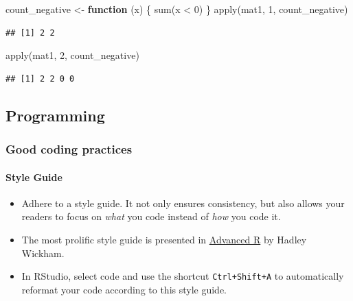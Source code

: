 \documentclass[
  11pt,
]{article}
\newenvironment{Shaded}{\begin{snugshade}}{\end{snugshade}}
\newcommand{\ControlFlowTok}[1]{\textcolor[rgb]{0.13,0.29,0.53}{\textbf{#1}}}
\newcommand{\DecValTok}[1]{\textcolor[rgb]{0.00,0.00,0.81}{#1}}
\newcommand{\FunctionTok}[1]{\textcolor[rgb]{0.00,0.00,0.00}{#1}}
\newcommand{\NormalTok}[1]{#1}
\newcommand{\OtherTok}[1]{\textcolor[rgb]{0.56,0.35,0.01}{#1}}
\newcommand{\SpecialCharTok}[1]{\textcolor[rgb]{0.00,0.00,0.00}{#1}}
\providecommand{\tightlist}{%
  \setlength{\itemsep}{0pt}\setlength{\parskip}{0pt}}
\begin{document}
\begin{Shaded}
\begin{Highlighting}[]
\NormalTok{count\_negative }\OtherTok{\textless{}{-}} \ControlFlowTok{function}\NormalTok{ (x) \{}
  \FunctionTok{sum}\NormalTok{(x }\SpecialCharTok{\textless{}} \DecValTok{0}\NormalTok{)}
\NormalTok{\}}
\FunctionTok{apply}\NormalTok{(mat1, }\DecValTok{1}\NormalTok{, count\_negative)}
\end{Highlighting}
\end{Shaded}

\begin{verbatim}
## [1] 2 2
\end{verbatim}

\begin{Shaded}
\begin{Highlighting}[]
\FunctionTok{apply}\NormalTok{(mat1, }\DecValTok{2}\NormalTok{, count\_negative)}
\end{Highlighting}
\end{Shaded}

\begin{verbatim}
## [1] 2 2 0 0
\end{verbatim}

\hypertarget{programming}{%
\subsection{Programming}\label{programming}}

\hypertarget{good-coding-practices}{%
\subsubsection{Good coding practices}\label{good-coding-practices}}

\hypertarget{style-guide}{%
\paragraph{Style Guide}\label{style-guide}}

\begin{itemize}
\tightlist
\item
  Adhere to a style guide. It not only ensures consistency, but also allows your readers to focus on \emph{what} you code instead of \emph{how} you code it.
\item
  The most prolific style guide is presented in \href{http://adv-r.had.co.nz/Style.html}{Advanced R} by Hadley Wickham.
\item
  In RStudio, select code and use the shortcut \texttt{Ctrl+Shift+A} to automatically reformat your code according to this style guide.
\end{itemize}
\end{document}
